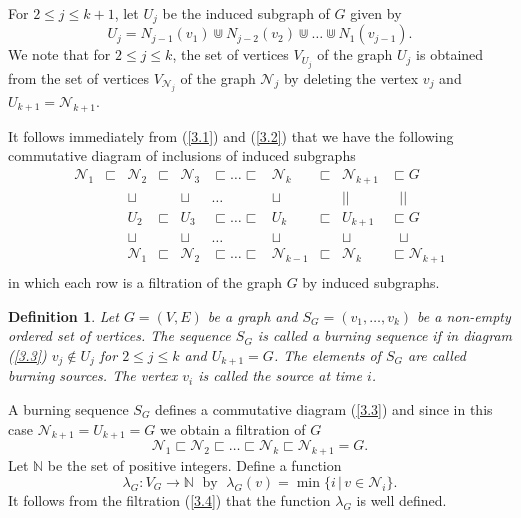 \documentclass[a4paper, 11pt]{article}
\newtheorem{definition}[theorem]{Definition}
\begin{document}
For $2\leq j\leq k+1$, let  $U_j$ be  the induced subgraph 
of $G$ given by   
\begin{equation}\label{3.2}
U_j=N_{j-1} (v_1)\Cup N_{j-2}(v_2)\Cup \dots \Cup N_1(v_{j-1}).
\end{equation}
We note that  for $2\leq j\leq k$, the set of vertices $V_{U_j}$ of the graph $U_j$ is obtained from the set of vertices $V_{\mathcal N_j}$ of the graph $\mathcal N_j$  by deleting the vertex $v_j$ and $U_{k+1}=\mathcal N_{k+1}$. 


It follows immediately from (\ref{3.1}) and (\ref{3.2}) that we have the following  commutative diagram of inclusions of induced subgraphs 
\begin{equation}\label{3.3}
\begin{matrix}
\mathcal N_1 &\sqsubset & \mathcal N_2& \sqsubset &\mathcal N_3&\sqsubset \dots \sqsubset  &\mathcal N_k&\sqsubset&\mathcal N_{k+1}&\sqsubset  G\\
 && \sqcup&  &\sqcup &\dots & \sqcup&&||&\  \ \ || \\
                  &  &U_2&\sqsubset& U_3&\sqsubset\dots \sqsubset  &U_k&\sqsubset&U_{k+1}&\sqsubset  G\\
&& \sqcup&  &\sqcup &\dots & \sqcup&&\sqcup&\ \ \  \sqcup \\
                  &  &\mathcal N_1&\sqsubset& \mathcal N_2&\sqsubset\dots \sqsubset  &\mathcal N_{k-1}&\sqsubset&\mathcal N_{k}&\sqsubset  \mathcal N_{k+1}\\
\end{matrix}
\end{equation}
in which each row is a  filtration of the graph  $G$ by induced subgraphs. 


\begin{definition}\label{d3.1} \rm Let $G=(V,E)$ be a graph and 
$S_G=(v_1, \dots, v_k)$ be a non-empty ordered  set of vertices. 
 The sequence $S_G$ is called a \emph{burning sequence}  if  in  diagram (\ref{3.3}) $v_j \notin U_j$ for $2\leq j\leq k$ and  $U_{k+1}=G$. 
 The elements of $S_G$ are called \emph{burning sources}. The vertex $v_i$ is called the \emph{source at time $i$}. 
\end{definition}


 A burning sequence $S_G$ defines a commutative diagram  (\ref{3.3}) and since in this case $\mathcal N_{k+1}=U_{k+1}=G$
we obtain a filtration of $G$ 
\begin{equation}\label{3.4}
\mathcal N_1 \sqsubset  \mathcal N_2\sqsubset \dots \sqsubset  \mathcal N_k\sqsubset \mathcal N_{k+1}=G. 
\end{equation}
Let $\mathbb N$ be the set of positive integers. Define a function 
\begin{equation}\label{3.5} 
\lambda_G\colon V_G\to \mathbb N\;\mbox{ by }\; \lambda_G(v)=\min\{i \,| \, v\in \mathcal N_i\}.
\end{equation}
It follows from  the  filtration (\ref{3.4})   that   the function $\lambda_G$ is well defined. 
\end{document}
